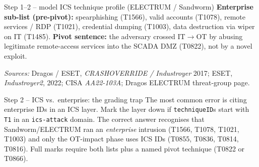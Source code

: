 \documentclass[11pt,a4paper]{article}
\begin{document}
\begin{solutionbox}{Step 1--2 -- model ICS technique profile (ELECTRUM / Sandworm)}
\textbf{Enterprise sub-list (pre-pivot):} spearphishing (T1566), valid accounts
(T1078), remote services / RDP (T1021), credential dumping (T1003), data
destruction via wiper on IT (T1485). \textbf{Pivot sentence:} the adversary
crossed IT$\to$OT by abusing legitimate remote-access services into the SCADA
DMZ (T0822), not by a novel exploit.

{\footnotesize\emph{Sources:} Dragos / ESET, \emph{CRASHOVERRIDE / Industroyer}
2017; ESET, \emph{Industroyer2}, 2022; CISA \emph{AA22-103A}; Dragos ELECTRUM
threat-group page.}
\end{solutionbox}

\begin{solutionbox}{Step 2 -- ICS vs.\ enterprise: the grading trap}
The most common error is citing enterprise IDs in an ICS layer. Mark the layer
down if \texttt{techniqueID}s start with \texttt{T1} in an \texttt{ics-attack}
domain. The correct answer recognises that Sandworm/ELECTRUM ran an
\emph{enterprise} intrusion (T1566, T1078, T1021, T1003) and only the OT-impact
phase uses ICS IDs (T0855, T0836, T0814, T0816). Full marks require both lists
plus a named pivot technique (T0822 or T0866).
\end{solutionbox}
\end{document}
